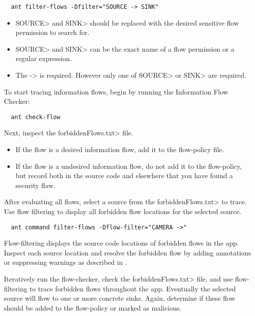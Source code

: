 \begin{Verbatim}
  ant filter-flows -Dfilter="SOURCE -> SINK"
\end{Verbatim}

\begin{itemize}

\item \<SOURCE> and \<SINK> should be replaced with the desired sensitive flow
permission to search for.

\item \<SOURCE> and \<SINK> can be the exact name of a flow permission or a regular
expression.

\item The -> is required. However only one of \<SOURCE> or \<SINK> are required.
\end{itemize}

To start tracing information flows, begin by running the Information Flow Checker:

\begin{Verbatim}
  ant check-flow
\end{Verbatim}

Next, inspect the \<forbiddenFlows.txt> file. 

\begin{itemize}
\item
If the flow is a desired information flow, add it to the flow-policy file.
\item
If the flow is a undesired information flow, do not add it to the flow-policy,
but record both in the source code and elsewhere that you have found a security flaw.
\end{itemize}

After evaluating all flows, select a source from the \<forbiddenFlows.txt> to trace.
Use flow filtering to display
all forbidden flow locations for the selected source.

\begin{Verbatim}
  ant command filter-flows -Dflow-filter="CAMERA ->"
\end{Verbatim}

Flow-filtering displays the source code locations of forbidden flows in the app.
Inspect each source location and resolve the forbidden flow by adding annotations
or suppressing warnings as described in .

Iteratively run the flow-checker, check the \<forbiddenFlows.txt> file, and use flow-filtering
to trace forbidden flows throughout the app.  Eventually the selected source will flow
to one or more concrete sinks. Again, determine if these flow should be added to the flow-policy
or marked as malicious.

